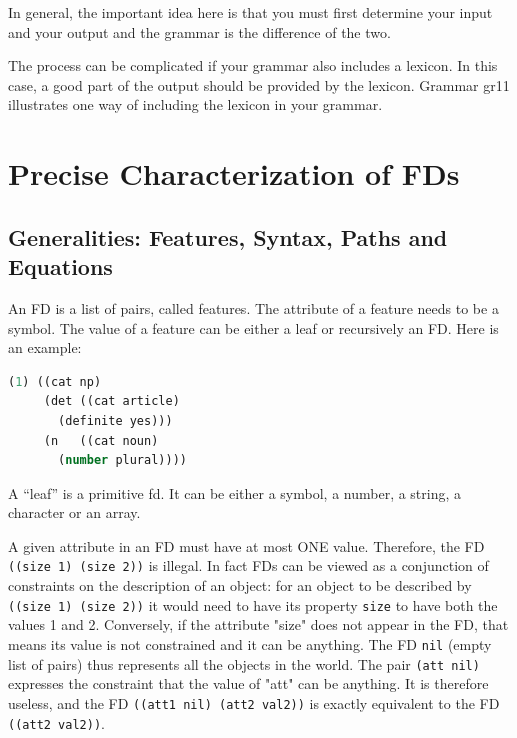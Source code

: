 \documentclass[10pt,a4paper]{report}
\begin{document}
In general, the important idea here is that you must first determine your
input and your output and the grammar is the difference of the two.

The process can be complicated if your grammar also includes a lexicon.  In
this case, a good part of the output should be provided by the lexicon.
Grammar gr11 illustrates one way of including the lexicon in your grammar.


\chapter{Precise Characterization of FDs}
\label{sect-syntax}


\section{Generalities: Features, Syntax, Paths and Equations}
    

An FD is a list of pairs, called features. The attribute of a feature needs
to be a symbol.  The value of a feature can be either a leaf or recursively
an FD. Here is an example: 

\begin{lstlisting}[language=Lisp]
(1) ((cat np)
     (det ((cat article)
	   (definite yes)))
     (n   ((cat noun)
	   (number plural))))
\end{lstlisting}

A ``leaf'' is a primitive fd.  It can be either a symbol, a number, a
string, a character or an array.

A given attribute in an FD must have at most ONE value.
Therefore, the FD {\tt ((size 1) (size 2))} is illegal. In fact FDs
can be viewed as a conjunction of constraints on the description
of an object: for an object to be described by {\tt ((size 1) (size
2))} it would need to have its property {\tt size} to have both the
values 1 and 2.  Conversely, if the attribute "size" does not
appear in the FD, that means its value is not constrained and it
can be anything.  The FD {\tt nil} (empty list of pairs) thus
represents all the objects in the world. The pair {\tt (att nil)}
expresses the constraint that the value of "att" can be anything.
It is therefore useless, and the FD {\tt ((att1 nil) (att2 val2))} is
exactly equivalent to the FD {\tt ((att2 val2))}.  
 
\end{document}
